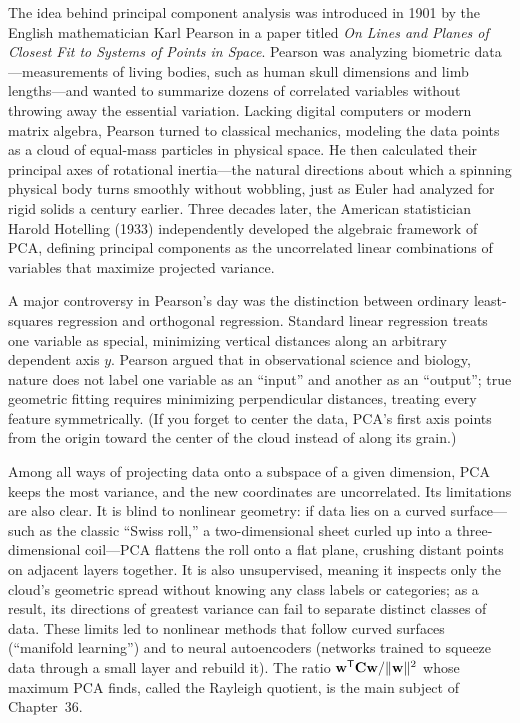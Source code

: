 \begin{historybox}
The idea behind principal component analysis was introduced in 1901 by the English
mathematician Karl Pearson in a paper titled \emph{On Lines and Planes of Closest
Fit to Systems of Points in Space}. Pearson was analyzing biometric data---measurements
of living bodies, such as human skull dimensions and limb lengths---and wanted to
summarize dozens of correlated variables without throwing away the essential variation.
Lacking digital computers or modern matrix algebra, Pearson turned to classical
mechanics, modeling the data points as a cloud of equal-mass particles in physical
space. He then calculated their principal axes of rotational inertia---the natural
directions about which a spinning physical body turns smoothly without wobbling, just
as Euler had analyzed for rigid solids a century earlier. Three decades later, the American
statistician Harold Hotelling (1933) independently developed the algebraic framework of
PCA, defining principal components as the uncorrelated linear combinations of variables
that maximize projected variance.

A major controversy in Pearson's day was the distinction between ordinary least-squares
regression and orthogonal regression. Standard linear regression treats one variable as
special, minimizing vertical distances along an arbitrary dependent axis $y$. Pearson
argued that in observational science and biology, nature does not label one variable as
an ``input'' and another as an ``output''; true geometric fitting requires minimizing
perpendicular distances, treating every feature symmetrically. (If you forget to
center the data, PCA's first axis points from the origin toward the center of the
cloud instead of along its grain.)

Among all ways of projecting data onto a subspace of a given dimension, PCA keeps
the most variance, and the new coordinates are uncorrelated. Its limitations are
also clear. It is blind to nonlinear
geometry: if data lies on a curved surface---such as the classic ``Swiss roll,'' a
two-dimensional sheet curled up into a three-dimensional coil---PCA flattens the roll
onto a flat plane, crushing distant points on adjacent layers together. It is also
unsupervised, meaning it inspects only the cloud's geometric spread without knowing any
class labels or categories; as a result, its directions of greatest variance can fail to
separate distinct classes of data. These limits led to nonlinear methods that
follow curved surfaces (``manifold learning'') and to neural autoencoders (networks
trained to squeeze data through a small layer and rebuild it).
The ratio $\mathbf{w}^{\mathsf{T}}\mathbf{C}\mathbf{w} / \lVert\mathbf{w}\rVert^2$ whose maximum PCA
finds, called the Rayleigh quotient, is the main subject of Chapter~36.
\end{historybox}

